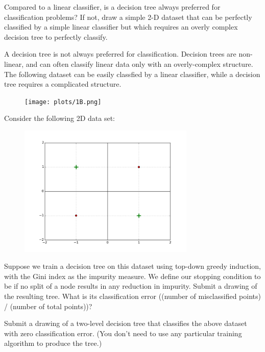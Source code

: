 \problem[4]
Compared to a linear classifier, is a decision tree always preferred for classification problems? If not, draw a simple 2-D dataset that can be perfectly classified by a simple linear classifier but which requires an overly complex decision tree to perfectly classify.

\begin{solution}
    A decision tree is not always preferred for classification. Decision trees are non-linear, and can often classify linear data only with an overly-complex structure. The following dataset can be easily classfied by a linear classifier, while a decision tree requires a complicated structure.
    \begin{figure}[H]
    \begin{center}
    \texttt{[image: plots/1B.png]}
    \end{center}
    \end{figure}
\end{solution}

\problem[15]
Consider the following 2D data set:
\begin{figure}[H]
    \begin{center}
    \includegraphics[width=3.3in]{plots/3C.png}
    \end{center}
    \end{figure}

\subproblem[5] Suppose we train a decision tree on this dataset using top-down greedy induction, with the Gini index as
the impurity measure. We define our stopping condition to be if no split of a node
results in any reduction in impurity. Submit a drawing of the resulting tree.  What is its classification error ((number of misclassified points) / (number of total points))?

\subproblem[5] Submit a drawing of a two-level decision tree that classifies the above dataset with zero classification error.  (You don't need to use any particular training algorithm to produce the tree.)

